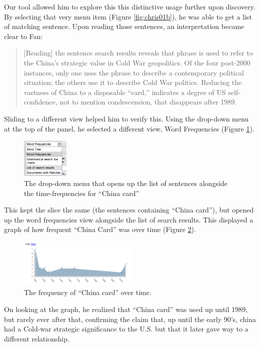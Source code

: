 \documentclass{sig-alternate}
\begin{document}
Our tool allowed him to explore this this distinctive usage further upon discovery. By selecting that very menu item (Figure \ref{fig:chris01b}), he was able to get a list of matching sentence. Upon reading those sentences, an interpretation became clear to Fan:
\begin{quote}[Reading] the sentence search results reveals that phrase is used to refer to the China's strategic value in Cold War geopolitics. Of the four post-2000 instances, only one uses the phrase to describe a contemporary political situation; the others use it to describe Cold War politics. Reducing the vastness of China to a disposable ``card,'' indicates a degree of US self-confidence, not to mention condescension, that disappears after 1989.\end{quote}

Sliding to a different view helped him to verify this. Using the drop-down menu at the top of the panel, he selected a different view, Word Frequencies (Figure \ref{fig:chris03}). 
\begin{figure}[h!]
\includegraphics[width=0.2\textwidth]{fig/chris/03.png}
\caption{ The drop-down menu that opens up the list of sentences alongside the time-frequencies for ``China card''  \label{fig:chris03}}
\end{figure}

This kept the slice the same (the sentences containing ``China card''), but opened up the word frequencies view alongside the list of search results.  This displayed a graph of how frequent ``China Card'' was over time (Figure \ref{fig:chris02}). 

\begin{figure}[h!]
\includegraphics[width=0.5\textwidth]{fig/chris/02.png}
\caption{ The frequency of ``China card'' over time. \label{fig:chris02}}
\end{figure}
On looking at the graph, he realized that  ``China card'' was used up until 1989, but rarely ever after that, confirming the claim that, up until the early 90's, china had a Cold-war strategic significance to the U.S. but that it later gave way to a different relationship.
\end{document}
